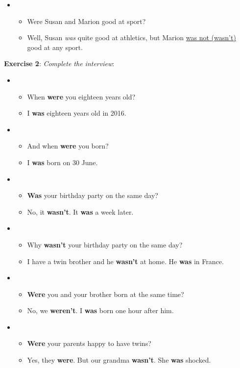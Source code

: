 \begin{itemize}
\item
\begin{itemize}
\item Were Susan and Marion good at sport?
\item Well, Susan \textit{was} quite good at athletics, but Marion \underline{was not (wasn't)} good at any sport.
\end{itemize}

\end{itemize}

\textbf{Exercise 2}: \textit{Complete the interview}:

\begin{itemize}

\item
\begin{itemize}
\item When \textbf{were} you eighteen years old?
\item I \textbf{was} eighteen years old in 2016.
\end{itemize}

\item
\begin{itemize}
\item And when \textbf{were} you born?
\item I \textbf{was} born on 30 June.
\end{itemize}

\item
\begin{itemize}
\item \textbf{Was} your birthday party on the same day?
\item No, it \textbf{wasn't}. It \textbf{was} a week later.
\end{itemize}

\item
\begin{itemize}
\item Why \textbf{wasn't} your birthday party on the same day?
\item I have a twin brother and he \textbf{wasn't} at home. He \textbf{was} in France.
\end{itemize}

\item
\begin{itemize}
\item \textbf{Were} you and your brother born at the same time?
\item No, we \textbf{weren't}. I \textbf{was} born one hour after him.
\end{itemize}

\item
\begin{itemize}
\item \textbf{Were} your parents happy to have twins?
\item Yes, they \textbf{were}. But our grandma \textbf{wasn't}. She \textbf{was} shocked.
\end{itemize}

\end{itemize}


